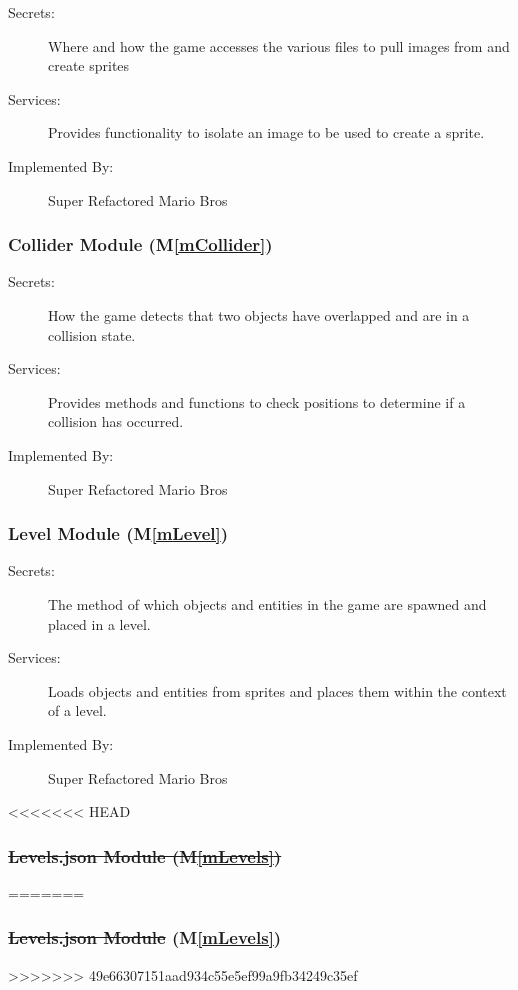 \documentclass[12pt, titlepage]{article}
\newcommand{\mref}[1]{M\ref{#1}}
\begin{document}
\begin{description}
\item[Secrets:] Where and how the game accesses the various files to pull images from and create sprites
\item[Services:] Provides functionality to isolate an image to be used to create a sprite.
\item[Implemented By:] Super Refactored Mario Bros
\end{description}

\subsubsection{Collider Module (\mref{mCollider})}

\begin{description}
\item[Secrets:] How the game detects that two objects have overlapped and are in a collision state.
\item[Services:] Provides methods and functions to check positions to determine if a collision has occurred.
\item[Implemented By:] Super Refactored Mario Bros
\end{description}

\subsubsection{Level Module (\mref{mLevel})}

\begin{description}
\item[Secrets:] The method of which objects and entities in the game are spawned and placed in a level.
\item[Services:] Loads objects and entities from sprites and places them within the context of a level.
\item[Implemented By:] Super Refactored Mario Bros
\end{description}

<<<<<<< HEAD
\subsubsection{\sout{Levels.json Module (\mref{mLevels})}}
=======
\subsubsection{\sout{Levels.json Module} (\mref{mLevels})}
>>>>>>> 49e66307151aad934c55e5ef99a9fb34249c35ef
\end{document}
